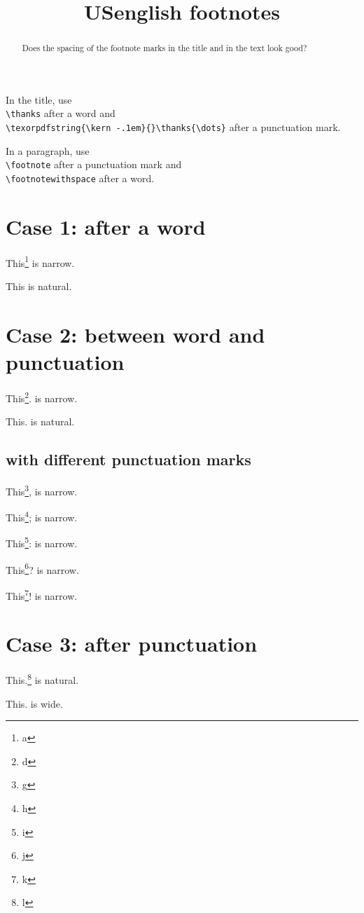 \documentclass{snapshotmfo}
\author{%
natural\thanks{natural spacing} and
narrow,\texorpdfstring{\hskip -.1em}{}\thanks{narrow spacing}
spacing of footnotemarks in the title
\and Author Two}
\title{USenglish footnotes}
\begin{document}

\begin{abstract}
Does the spacing of the footnote marks in the title and in the text look good?
\end{abstract}

In the title, use\\
\verb+\thanks+ after a word and\\
\verb+\texorpdfstring{\kern -.1em}{}\thanks{\dots}+ after a punctuation mark.

In a paragraph, use\\
\verb+\footnote+ after a punctuation mark and\\
\verb+\footnotewithspace+ after a word.


\section{Case 1: after a word}

\noindent This\footnote{a} is narrow.

\noindent This is natural.


\section{Case 2: between word and punctuation}

\noindent This\footnote{d}. is narrow.

\noindent This. is natural.


\subsection{with different punctuation marks}

\noindent This\footnote{g}, is narrow.

\noindent This\footnote{h}; is narrow.

\noindent This\footnote{i}: is narrow.

\noindent This\footnote{j}? is narrow.

\noindent This\footnote{k}! is narrow.


\section{Case 3: after punctuation}

\noindent This.\footnote{l} is natural.

\noindent This. is wide.
\end{document}
